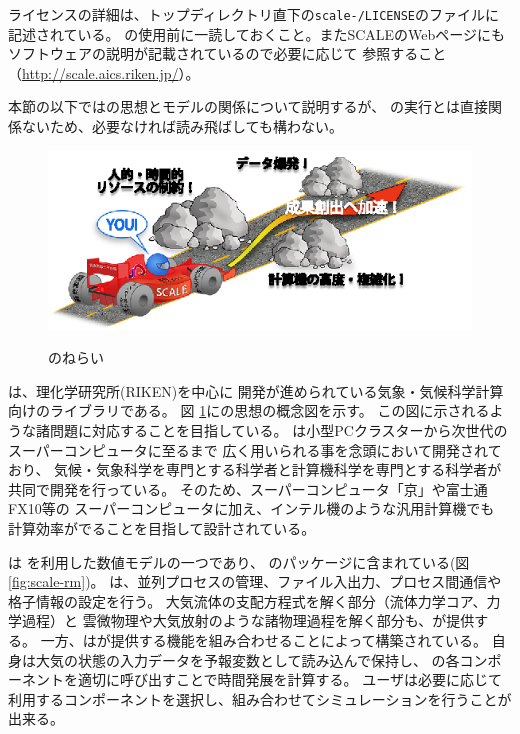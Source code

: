 ライセンスの詳細は、トップディレクトリ直下の\texttt{scale-\version/LICENSE}のファイルに記述されている。
\scalelib の使用前に一読しておくこと。またSCALEのWebページにもソフトウェアの説明が記載されているので必要に応じて
参照すること（\url{http://scale.aics.riken.jp/}）。

本節の以下では\scalelib の思想とモデルの関係について説明するが、
\scalerm の実行とは直接関係ないため、必要なければ読み飛ばしても構わない。


\begin{figure}[htb]
\begin{center}
  \includegraphics[width=0.9\hsize]{./figure/library.eps}\\
  \caption{\scalelib のねらい}
  \label{fig:scale}
\end{center}
\end{figure}

\scalelib は、理化学研究所(RIKEN)を中心に
開発が進められている気象・気候科学計算向けのライブラリである。
図 \ref{fig:scale}に\scalelib の思想の概念図を示す。
この図に示されるような諸問題に対応することを目指している。
\scalelib は小型PCクラスターから次世代のスーパーコンピュータに至るまで
広く用いられる事を念頭において開発されており、
気候・気象科学を専門とする科学者と計算機科学を専門とする科学者が
共同で開発を行っている。
そのため、スーパーコンピュータ「京」や富士通FX10等の
スーパーコンピュータに加え、インテル機のような汎用計算機でも
計算効率がでることを目指して設計されている。

\scalerm は \scalelib を利用した数値モデルの一つであり、
\scalelib のパッケージに含まれている(図 \ref{fig:scale-rm})。
\scalelib は、並列プロセスの管理、ファイル入出力、プロセス間通信や格子情報の設定を行う。
大気流体の支配方程式を解く部分（流体力学コア、力学過程）と
雲微物理や大気放射のような諸物理過程を解く部分も、\scalelib が提供する。
一方、\scalerm は\scalelib が提供する機能を組み合わせることによって構築されている。
\scalerm 自身は大気の状態の入力データを予報変数として読み込んで保持し、
\scalelib の各コンポーネントを適切に呼び出すことで時間発展を計算する。
ユーザは必要に応じて利用するコンポーネントを選択し、組み合わせてシミュレーションを行うことが出来る。

